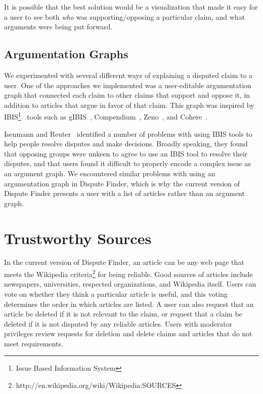 \documentclass{www2010-submission}
\begin{document}
It is possible that the best solution would be a visualization that made it easy for a user to see both {\it who} was supporting/opposing a particular claim, and what arguments were being put forward.

\subsection{Argumentation Graphs}

We experimented with several different ways of explaining a disputed claim to a user. One of the approaches we implemented was a user-editable argumentation graph that connected each claim to other claims that support and oppose it, in addition to articles that argue in favor of that claim. This graph was inspired by IBIS\footnote{Issue Based Information System}~\cite{Rittel1973} tools such as gIBIS~\cite{Conklin1987a}, Compendium~\cite{Selvin2001}, Zeno~\cite{Gordon1997}, and Cohere~\cite{Shum2008}. 

Isenmann and Reuter~\cite{Isenmann1997} identified a number of problems with using IBIS tools to help people resolve disputes and make decisions. Broadly speaking, they found that opposing groups were unkeen to agree to use an IBIS tool to resolve their disputes, and that users found it difficult to properly encode a complex issue as an argument graph. We encountered similar problems with using an argumentation graph in Dispute Finder, which is why the current version of Dispute Finder presents a user with a list of articles rather than an argument graph.



\section{Trustworthy Sources}

In the current version of Dispute Finder, an article can be any web page that meets the Wikipedia criteria\footnote{http://en.wikipedia.org/wiki/Wikipedia:SOURCES} for being reliable. Good sources of articles include newspapers, universities, respected organizations, and Wikipedia itself. Users can vote on whether they think a particular article is useful, and this voting determines the order in which articles are listed. A user can also request that an article be deleted if it is not relevant to the claim, or request that a claim be deleted if it is not disputed by any reliable articles. Users with moderator privileges review requests for deletion and delete claims and articles that do not meet requirements.
\end{document}
